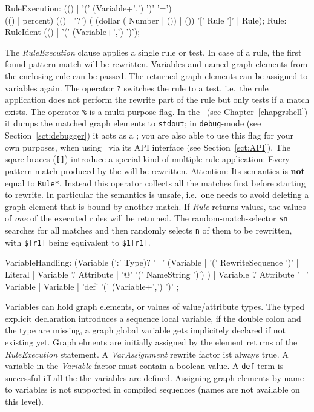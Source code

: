 \begin{rail}    
  RuleExecution: (() | '(' (Variable+',') ')' '=') \\ (() | percent) (() | '?') ( (dollar ( Number | ()) | ()) '[' Rule ']' | Rule);   
  Rule: RuleIdent (() | '(' (Variable+',') ')');
\end{rail} 
The \emph{RuleExecution} clause applies a single rule or test.
In case of a rule, the first found pattern match will be rewritten.
Variables and named graph elements from the enclosing rule can be passed.
The returned graph elements can be assigned to variables again.
The operator \texttt{?} switches the rule to a test, i.e.\ the rule application does not perform the rewrite part of the rule but only tests if a match exists.
The operator \texttt{\%} is a multi-purpose flag. 
In the \GrShell\ (see Chapter~\ref{chapgrshell}) it dumps the matched graph elements to \texttt{stdout};
in \texttt{debug}-mode (see Section~\ref{sct:debugger}) it acts as a ;
you are also able to use this flag for your own purposes, when using \GrG\ via its API interface (see Section~\ref{sct:API}).
The sqare braces (\texttt{[]}) introduce a special kind of multiple rule application:
Every pattern match produced by the will be rewritten.
Attention: Its semantics is \textbf{not} equal to \texttt{Rule*}.
Instead this operator collects all the matches first before starting to rewrite.
In particular the semantics is unsafe, i.e.\ one needs to avoid deleting a graph element that is bound by another match.
If \emph{Rule} returns values, the values of \emph{one} of the executed rules will be returned.
The random-match-selector \texttt{\$n} searches for all matches and then randomly selects \texttt{n} of them to be rewritten, with \texttt{\$[r1]} being equivalent to \texttt{\$1[r1]}.

\begin{rail}
  VariableHandling: 
    (Variable (':' Type)? '=' 
	  (Variable | 
      '(' RewriteSequence ')' | 
      Literal | 
	  Variable '.' Attribute |
	  '@' '(' NameString ')')
    ) |
	Variable '.' Attribute '=' Variable |
    Variable |
    'def' '(' (Variable+',') ')'
  ;
\end{rail}\makeatother
Variables can hold graph elements, or values of value/attribute types.
The typed explicit declaration introduces a sequence local variable, 
if the double colon and the type are missing, a graph global variable gets implicitely declared if not existing yet.
Graph elments are initially assigned by the element returns of the \emph{RuleExecution} statement.
A \emph{VarAssignment} rewrite factor ist always true.
A variable in the \emph{Variable} factor must contain a boolean value.
A \texttt{def} term is successful iff all the the variables are defined.
Assigning graph elements by name to variables is not supported in compiled sequences (names are not available on this level).

